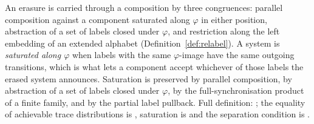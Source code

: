 \begin{definition}
  An erasure is carried through a composition by three congruences: parallel composition against a component saturated along $\varphi$ in either position, abstraction of a set of labels closed under $\varphi$, and restriction along the left embedding of an extended alphabet (Definition~\ref{def:relabel}).
  A system is \emph{saturated along $\varphi$} when labels with the same $\varphi$-image have the same outgoing transitions, which is what lets a component accept whichever of those labels the erased system announces.
  Saturation is preserved by parallel composition, by abstraction of a set of labels closed under $\varphi$, by the full-synchronisation product of a finite family, and by the partial label pullback.
  Full definition: ; the equality of achievable trace distributions is , saturation is  and the separation condition is .
\end{definition}
